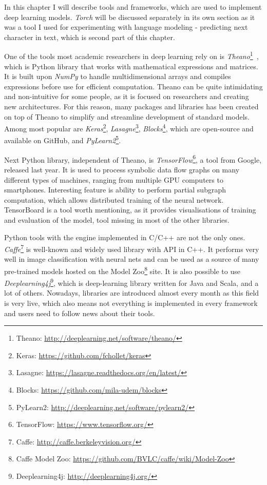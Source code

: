 In this chapter I will describe tools and frameworks, which are used to implement deep learning models. \emph{Torch} will be discussed separately in its own section as it was a tool I used for experimenting with language modeling - predicting next character in text, which is second part of this chapter.


One of the tools most academic researchers in deep learning rely on is \emph{Theano}\footnote{Theano: \url{http://deeplearning.net/software/theano/}}~\cite{bergstra-proc-scipy-2010}, which is Python library that works with mathematical expressions and matrices. It is built upon \emph{NumPy} to handle multidimensional arrays and compiles expressions before use for efficient computation. Theano can be quite intimidating and non-intuitive for some people, as it is focused on researchers and creating new architectures. For this reason, many packages and libraries has been created on top of Theano to simplify and streamline development of standard models. Among most popular are \emph{Keras}\footnote{Keras: \url{https://github.com/fchollet/keras}}, \emph{Lasagne}\footnote{Lasagne: \url{https://lasagne.readthedocs.org/en/latest/}}, \emph{Blocks}\footnote{Blocks: \url{https://github.com/mila-udem/blocks}}, which are open-source and available on GitHub, and \emph{PyLearn2}\footnote{PyLearn2: \url{http://deeplearning.net/software/pylearn2/}}.

Next Python library, independent of Theano, is \emph{TensorFlow}\footnote{TensorFlow: \url{https://www.tensorflow.org/}}, a tool from Google, released last year. It is used to process symbolic data flow graphs on many different types of machines, ranging from multiple GPU computers to smartphones. Interesting feature is ability to perform partial subgraph computation, which allows distributed training of the neural network. TensorBoard is a tool worth mentioning, as it provides visualisations of training and evaluation of the model, tool missing in most of the other libraries.

Python tools with the engine implemented in C/C++ are not the only ones. \emph{Caffe}\footnote{Caffe: \url{http://caffe.berkeleyvision.org/}} is well-known and widely used library with API in C++. It performs very well in image classification with neural nets and can be used as a source of many pre-trained models hosted on the Model Zoo\footnote{Caffe Model Zoo: \url{https://github.com/BVLC/caffe/wiki/Model-Zoo}} site. It is also possible to use \emph{Deeplearning4j}\footnote{Deeplearning4j: \url{http://deeplearning4j.org/}}, which is deep-learning library written for Java and Scala, and a lot of others. Nowadays, libraries are introduced almost every month as this field is very live, which also means not everything is implemented in every framework and users need to follow news about their tools.

